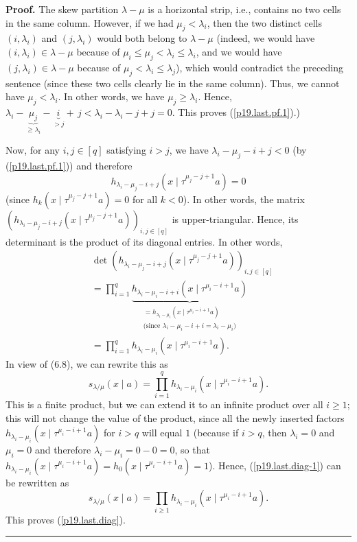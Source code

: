 \documentclass[numbers=enddot,12pt,final,onecolumn,notitlepage]{scrartcl}%
\theoremstyle{definition}
\newenvironment{proof}[1][Proof]{\noindent\textbf{#1.} }{\ \rule{0.5em}{0.5em}}
\let\prodnonlimits\prod
\renewcommand{\prod}{\prodnonlimits\limits}
\begin{document}
\begin{enumerate}
\begin{proof}
The skew partition $\lambda-\mu$ is a horizontal strip, i.e., contains no two
cells in the same column. However, if we had $\mu_{j}<\lambda_{i}$, then the
two distinct cells $\left(  i,\lambda_{i}\right)  $ and $\left(  j,\lambda
_{i}\right)  $ would both belong to $\lambda-\mu$ (indeed, we would have
$\left(  i,\lambda_{i}\right)  \in\lambda-\mu$ because of $\mu_{i}\leq\mu
_{j}<\lambda_{i}\leq\lambda_{i}$, and we would have $\left(  j,\lambda
_{i}\right)  \in\lambda-\mu$ because of $\mu_{j}<\lambda_{i}\leq\lambda_{j}$),
which would contradict the preceding sentence (since these two cells clearly
lie in the same column). Thus, we cannot have $\mu_{j}<\lambda_{i}$. In other
words, we have $\mu_{j}\geq\lambda_{i}$. Hence, $\lambda_{i}-\underbrace{\mu
_{j}}_{\geq\lambda_{i}}-\underbrace{i}_{>j}+\,j<\lambda_{i}-\lambda_{i}%
-j+j=0$. This proves (\ref{p19.last.pf.1}).)

Now, for any $i,j\in\left[  q\right]  $ satisfying $i>j$, we have $\lambda
_{i}-\mu_{j}-i+j<0$ (by (\ref{p19.last.pf.1})) and therefore
\[
h_{\lambda_{i}-\mu_{j}-i+j}\left(  x\mid\tau^{\mu_{j}-j+1}a\right)  =0
\]
(since $h_{k}\left(  x\mid\tau^{\mu_{j}-j+1}a\right)  =0$ for all $k<0$). In
other words, the matrix $\left(  h_{\lambda_{i}-\mu_{j}-i+j}\left(  x\mid
\tau^{\mu_{j}-j+1}a\right)  \right)  _{i,j\in\left[  q\right]  }$ is
upper-triangular. Hence, its determinant is the product of its diagonal
entries. In other words,%
\begin{align*}
&  \det\left(  h_{\lambda_{i}-\mu_{j}-i+j}\left(  x\mid\tau^{\mu_{j}%
-j+1}a\right)  \right)  _{i,j\in\left[  q\right]  }\\
&  =\prod_{i=1}^{q}\underbrace{h_{\lambda_{i}-\mu_{i}-i+i}\left(  x\mid
\tau^{\mu_{i}-i+1}a\right)  }_{\substack{=h_{\lambda_{i}-\mu_{i}}\left(
x\mid\tau^{\mu_{i}-i+1}a\right)  \\\text{(since }\lambda_{i}-\mu
_{i}-i+i=\lambda_{i}-\mu_{i}\text{)}}}\\
&  =\prod_{i=1}^{q}h_{\lambda_{i}-\mu_{i}}\left(  x\mid\tau^{\mu_{i}%
-i+1}a\right)  .
\end{align*}
In view of (6.8), we can rewrite this as%
\begin{equation}
s_{\lambda/\mu}\left(  x\mid a\right)  =\prod_{i=1}^{q}h_{\lambda_{i}-\mu_{i}%
}\left(  x\mid\tau^{\mu_{i}-i+1}a\right)  . \label{p19.last.diag-1}%
\end{equation}
This is a finite product, but we can extend it to an infinite product over all
$i\geq1$; this will not change the value of the product, since all the newly
inserted factors $h_{\lambda_{i}-\mu_{i}}\left(  x\mid\tau^{\mu_{i}%
-i+1}a\right)  $ for $i>q$ will equal $1$ (because if $i>q$, then $\lambda
_{i}=0$ and $\mu_{i}=0$ and therefore $\lambda_{i}-\mu_{i}=0-0=0$, so that
$h_{\lambda_{i}-\mu_{i}}\left(  x\mid\tau^{\mu_{i}-i+1}a\right)  =h_{0}\left(
x\mid\tau^{\mu_{i}-i+1}a\right)  =1$). Hence, (\ref{p19.last.diag-1}) can be
rewritten as%
\[
s_{\lambda/\mu}\left(  x\mid a\right)  =\prod_{i\geq1}h_{\lambda_{i}-\mu_{i}%
}\left(  x\mid\tau^{\mu_{i}-i+1}a\right)  .
\]
This proves (\ref{p19.last.diag}).
\end{proof}


\end{enumerate}
\end{document}
